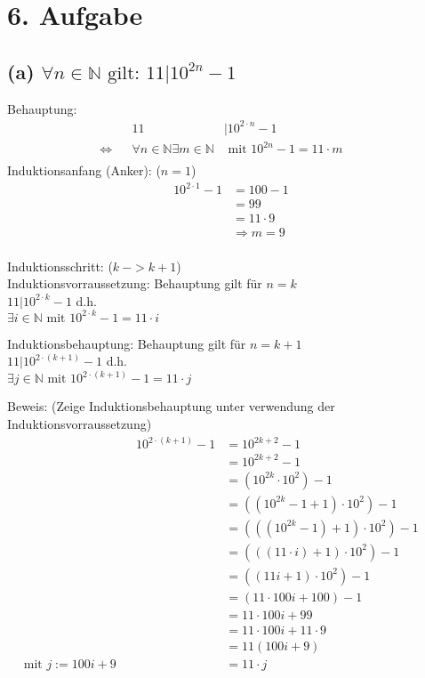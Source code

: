 \documentclass[]{article}
\newcommand{\eq}{\Leftrightarrow}
\newcommand{\rarr}{\Rightarrow}
\begin{document}
\section*{6. Aufgabe}
\subsection*{(a) $\forall n \in \mathbb{N} \text{ gilt: } 11|10^{2n} -1 $}
Behauptung:
\begin{align*}
	 && 11&|10^{2 \cdot n}-1 &&\\
	 \eq&& \forall n \in \mathbb{N} \exists m \in \mathbb{N} &\text{ mit } 10^{2n}-1 = 11\cdot m  &&\\
\end{align*}
Induktionsanfang (Anker): ($n=1$)\\
\begin{align*}
	 && 10^{2 \cdot 1}-1 &= 100 - 1 &&\\
	 && &= 99 &&\\
	 && &= 11 \cdot 9 &&\\
	 && &\rarr m = 9 &&\\
\end{align*}

Induktionsschritt: ($k~ -> k+1$)\\
Induktionsvorraussetzung: Behauptung gilt für $n=k$\\
$11|10^{2\cdot k} - 1$ d.h. \\
$\exists i \in \mathbb{N} \text{ mit } 10^{2\cdot k}-1 = 11\cdot i$

Induktionsbehauptung: Behauptung gilt für $n = k+1$\\
$11|10^{2\cdot (k+1)} - 1$ d.h. \\
$\exists j \in \mathbb{N} \text{ mit } 10^{2\cdot (k+1)}-1 = 11\cdot j$


Beweis: (Zeige Induktionsbehauptung unter verwendung der Induktionsvorraussetzung)
\begin{align*}
	&& 10^{2\cdot (k+1)}-1 &= 10^{2k +2}-1 &&\\
	&&  &= 10^{2k +2}-1 &&\\
	&&  &= (10^{2k} \cdot 10^2) -1 &&\\
	&&  &= ((10^{2k} -1+1)\cdot 10^2) -1 &&\\
	&&  &= (((10^{2k} -1)+1)\cdot 10^2) -1 &&\\
	&&  &= (((11 \cdot i)+1)\cdot 10^2) -1 &&\\
	&&  &= ((11i+1)\cdot 10^2) -1 &&\\
	&&  &= (11 \cdot 100i+100) -1 &&\\
	&&  &= 11 \cdot 100i+99 &&\\
	&&  &= 11 \cdot 100i+11 \cdot 9 &&\\
	&&  &= 11(100i+ 9)&&\\
	\text{mit $j:=100i+9$}&&  &= 11 \cdot j&&\\
\end{align*}
\end{document}
